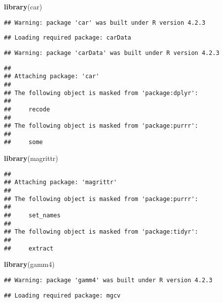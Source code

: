 \documentclass[
]{article}
\newenvironment{Shaded}{\begin{snugshade}}{\end{snugshade}}
\newcommand{\FunctionTok}[1]{\textcolor[rgb]{0.13,0.29,0.53}{\textbf{#1}}}
\newcommand{\NormalTok}[1]{#1}
\begin{document}
\begin{Shaded}
\begin{Highlighting}[]
\FunctionTok{library}\NormalTok{(car)}
\end{Highlighting}
\end{Shaded}

\begin{verbatim}
## Warning: package 'car' was built under R version 4.2.3
\end{verbatim}

\begin{verbatim}
## Loading required package: carData
\end{verbatim}

\begin{verbatim}
## Warning: package 'carData' was built under R version 4.2.3
\end{verbatim}

\begin{verbatim}
## 
## Attaching package: 'car'
## 
## The following object is masked from 'package:dplyr':
## 
##     recode
## 
## The following object is masked from 'package:purrr':
## 
##     some
\end{verbatim}

\begin{Shaded}
\begin{Highlighting}[]
\FunctionTok{library}\NormalTok{(magrittr)}
\end{Highlighting}
\end{Shaded}

\begin{verbatim}
## 
## Attaching package: 'magrittr'
## 
## The following object is masked from 'package:purrr':
## 
##     set_names
## 
## The following object is masked from 'package:tidyr':
## 
##     extract
\end{verbatim}

\begin{Shaded}
\begin{Highlighting}[]
\FunctionTok{library}\NormalTok{(gamm4)}
\end{Highlighting}
\end{Shaded}

\begin{verbatim}
## Warning: package 'gamm4' was built under R version 4.2.3
\end{verbatim}

\begin{verbatim}
## Loading required package: mgcv
\end{verbatim}
\end{document}
